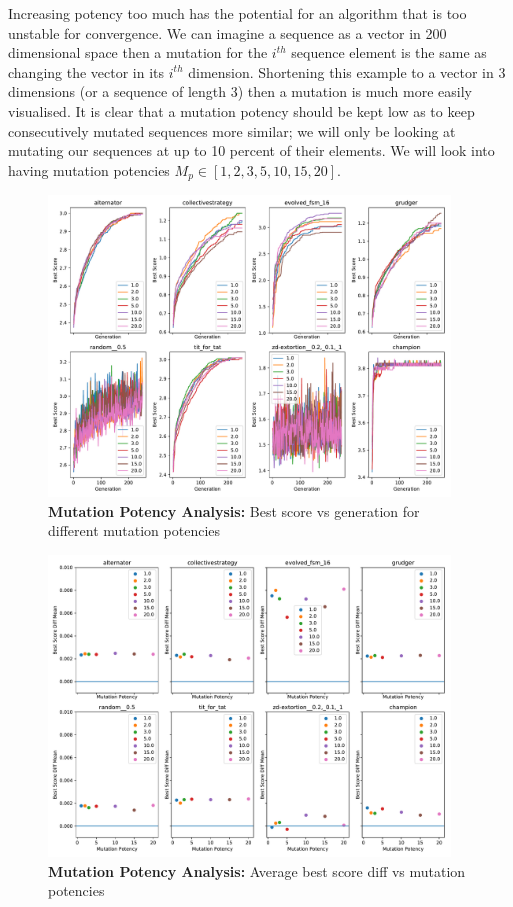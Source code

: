 Increasing potency too much has the potential for an algorithm that is too unstable for convergence.
We can imagine a sequence as a vector in 200 dimensional space then a mutation for the \(i^{th}\) sequence element is the same as changing the vector in its \(i^{th}\) dimension.
Shortening this example to a vector in 3 dimensions (or a sequence of length 3) then a mutation is much more easily visualised.
It is clear that a mutation potency should be kept low as to keep consecutively mutated sequences more similar;
we will only be looking at mutating our sequences at up to 10 percent of their elements.
We will look into having mutation potencies \(M_p \in [1,2,3,5,10,15,20]\).

\begin{figure}[ht]
    \includegraphics[width=0.95\textwidth, keepaspectratio, center]{./img/plots/MUT_POT_bs_v_gen_all.pdf}
    \caption{\textbf{Mutation Potency Analysis:} Best score vs generation for different mutation potencies}\label{fig:MUT-POT-bs-v-gen-all}
\end{figure}

\begin{figure}[ht]
    \includegraphics[width=0.95\textwidth, keepaspectratio, center]{./img/plots/MUT_POT_bs_diff_v_pot_all.pdf}
    \caption{\textbf{Mutation Potency Analysis:} Average best score diff vs mutation potencies}\label{fig:MUT-POT-bs-diff-v-pot-all}
\end{figure}

